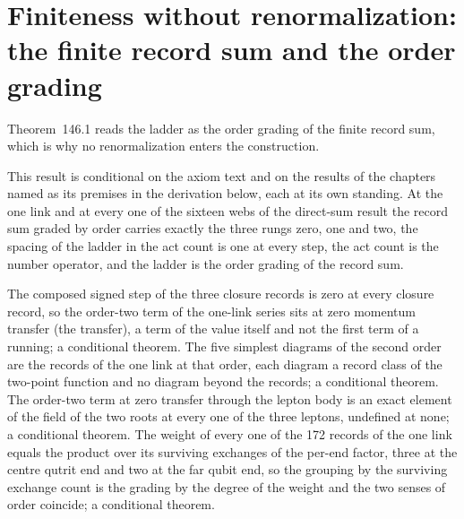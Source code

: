 \section{Finiteness without renormalization: the finite record sum and the order grading}\label{mod:V-6-finiteness-without-renormalization-the-finite-record-sum-and-the-order-grading}
\label{narr:open:5-6}Theorem~146.1 reads the ladder as the order grading of the finite record sum, which is why no renormalization enters the construction.
\begin{chconditional}\label{box:V-6-finiteness-without-renormalization-the-finite-record-sum-and-the-order-grading:1}
This result is conditional on the axiom text and on the results of the chapters named as its premises in the derivation below, each at its own standing.
At the one link and at every one of the sixteen webs of the direct-sum result the record sum graded by order carries exactly the three rungs zero, one and two, the spacing of the ladder in the act count is one at every step, the act count is the number operator, and the ladder is the order grading of the record sum.
\end{chconditional}
The composed signed step of the three closure records is zero at every closure record, so the order-two term of the one-link series sits at zero momentum transfer (the transfer), a term of the value itself and not the first term of a running; a conditional theorem.
The five simplest diagrams of the second order are the records of the one link at that order, each diagram a record class of the two-point function and no diagram beyond the records; a conditional theorem.
The order-two term at zero transfer through the lepton body is an exact element of the field of the two roots at every one of the three leptons, undefined at none; a conditional theorem.
The weight of every one of the 172 records of the one link equals the product over its surviving exchanges of the per-end factor, three at the centre qutrit end and two at the far qubit end, so the grouping by the surviving exchange count is the grading by the degree of the weight and the two senses of order coincide; a conditional theorem.
